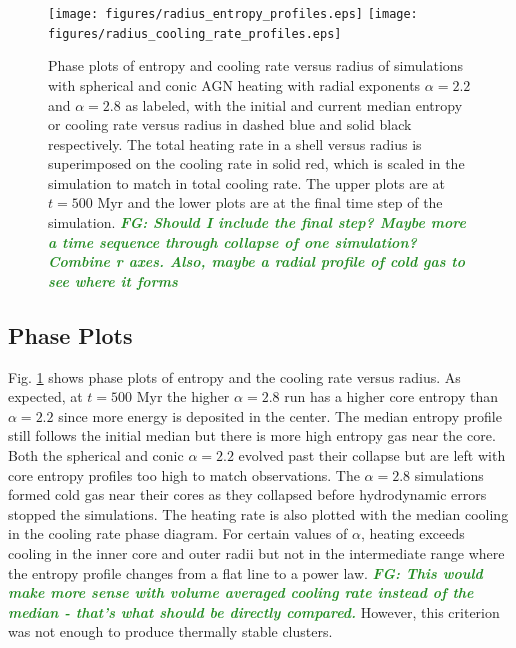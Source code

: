 \documentclass[iop,apjl, twocolappendix]{emulateapj}   %
\def\FG#1{{\textcolor{ForestGreen}{\textbf{\textit{ FG: #1}}}}}
\begin{document}
\begin{figure}
	\begin{center}
    \texttt{[image: figures/radius\_entropy\_profiles.eps]}
		\texttt{[image: figures/radius\_cooling\_rate\_profiles.eps]}
	\end{center}
	\caption{
    \label{fig:profiles}
    Phase plots of entropy and cooling rate versus radius of simulations with
    spherical and conic AGN heating with radial exponents $\alpha=2.2$ and
    $\alpha=2.8$ as labeled, with the initial and current median entropy or
    cooling rate versus radius in dashed blue and solid black respectively. The
    total heating rate in a shell versus radius is superimposed on the cooling
    rate in solid red, which is scaled in the simulation to match in total
    cooling rate.  The upper plots are at $t= 500 \text{ Myr}$
    and the lower plots are at the final time step of the simulation.
    \FG{Should I include the final step? Maybe more a time sequence through
    collapse of one simulation? Combine r axes. Also, maybe a radial profile of
    cold gas to see where it forms}}
\end{figure}

\subsection{Phase Plots}
\label{sec:phase_plots}

Fig. \ref{fig:profiles} shows phase plots of entropy and the cooling rate
versus radius. As expected, at $t= 500 \text{ Myr}$ the higher $\alpha=2.8$ run
has a higher core entropy than $\alpha=2.2$ since more energy is deposited in
the center. The median entropy profile still follows the initial median but
there is more high entropy gas near the core. Both the spherical and conic
$\alpha=2.2$ evolved past their collapse but are left with core entropy
profiles too high to match observations. The $\alpha=2.8$ simulations formed
cold gas near their cores as they collapsed before hydrodynamic errors stopped
the simulations.  The heating rate is also plotted with the median cooling in
the cooling rate phase diagram. For certain values of $\alpha$, heating exceeds
cooling in the inner core and outer radii but not in the intermediate range
where the entropy profile changes from a flat line to a power law. \FG{This
would make more sense with volume averaged cooling rate instead of the median -
that's what should be directly compared.} However, this criterion was not
enough to produce thermally stable clusters.
\end{document}
